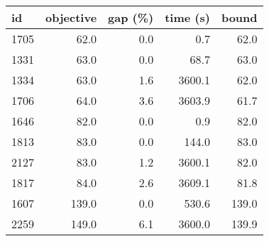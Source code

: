 \begin{tabular}{lrrrr}
\toprule
   id &  objective &  gap (\%) &  time (s) &  bound \\
\midrule
 1705 &       62.0 &      0.0 &       0.7 &   62.0 \\
 1331 &       63.0 &      0.0 &      68.7 &   63.0 \\
 1334 &       63.0 &      1.6 &    3600.1 &   62.0 \\
 1706 &       64.0 &      3.6 &    3603.9 &   61.7 \\
 1646 &       82.0 &      0.0 &       0.9 &   82.0 \\
 1813 &       83.0 &      0.0 &     144.0 &   83.0 \\
 2127 &       83.0 &      1.2 &    3600.1 &   82.0 \\
 1817 &       84.0 &      2.6 &    3609.1 &   81.8 \\
 1607 &      139.0 &      0.0 &     530.6 &  139.0 \\
 2259 &      149.0 &      6.1 &    3600.0 &  139.9 \\
\bottomrule
\end{tabular}
